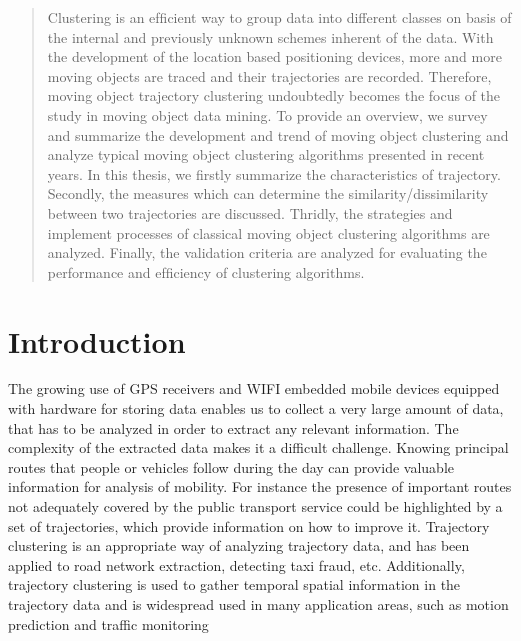 \documentclass[a4paper, 12pt]{article}
\begin{document}



\tableofcontents

\listoftables

\listoffigures

\listofmyequations

\cleardoublepage

\begin{abstract} 
Clustering is an efﬁcient way to group data into different classes on basis of the internal and previously unknown schemes inherent of the data. With the development of the location based positioning devices, more and more moving objects are traced and their trajectories are recorded. Therefore, moving object trajectory clustering undoubtedly becomes the focus of the study in moving object data mining. To provide an overview, we survey and summarize the development and trend of moving object clustering and analyze typical moving object clustering algorithms presented in recent years. In this thesis, we ﬁrstly summarize the characteristics of trajectory. Secondly, the measures which can determine the similarity/dissimilarity between two trajectories are discussed. Thridly, the strategies and implement processes of classical moving object clustering
algorithms are analyzed. Finally, the validation criteria are analyzed for evaluating the performance and efﬁciency of clustering algorithms. 
\end{abstract}

\pagebreak


\section{Introduction}
The growing use of GPS receivers and WIFI embedded mobile devices equipped with hardware for storing data enables us to collect a very large amount of data, that has to be analyzed in order to extract any relevant information. The complexity of the extracted data makes it a difficult challenge. Knowing principal routes that people or vehicles follow during the day can provide valuable information for analysis of mobility. For instance the presence of important routes not adequately covered by the public transport service could be highlighted by a set of trajectories, which provide information on how to improve it. Trajectory clustering is an appropriate way of analyzing trajectory data, and has been applied to road network extraction, detecting taxi fraud, etc. Additionally, trajectory clustering is used to gather temporal spatial information in the trajectory data and is widespread used in many application areas, such as motion prediction \citep{chen2010searching} and traffic monitoring \citep{atev2006learning}
\end{document}

